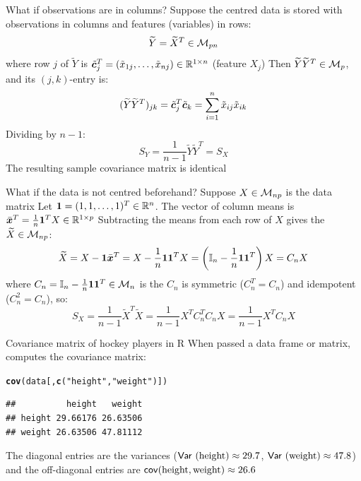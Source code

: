 \documentclass[aspectratio=169]{beamer}\usepackage[]{graphicx}\usepackage[]{xcolor}
\makeatletter
\newcommand{\hlsng}[1]{\textcolor[rgb]{0.192,0.494,0.8}{#1}}%
\newcommand{\hldef}[1]{\textcolor[rgb]{0.345,0.345,0.345}{#1}}%
\newcommand{\hlkwd}[1]{\textcolor[rgb]{0.737,0.353,0.396}{\textbf{#1}}}%
\newenvironment{kframe}{%
 \def\at@end@of@kframe{}%
 \ifinner\ifhmode%
  \def\at@end@of@kframe{\end{minipage}}%
  \begin{minipage}{\columnwidth}%
 \fi\fi%
 \def\FrameCommand##1{\hskip\@totalleftmargin \hskip-\fboxsep
 \colorbox{shadecolor}{##1}\hskip-\fboxsep
     \hskip-\linewidth \hskip-\@totalleftmargin \hskip\columnwidth}%
 \MakeFramed {\advance\hsize-\width
   \@totalleftmargin\z@ \linewidth\hsize
   \@setminipage}}%
 {\par\unskip\endMakeFramed%
 \at@end@of@kframe}
\newenvironment{knitrout}{}{} %
\makeatother
\begin{document}
\begin{frame}{What if observations are in columns?}
Suppose the centred data is stored with observations in columns and features (variables) in rows:
\[
\widetilde{Y} = \widetilde{X}^T \in \mathcal{M}_{pn}
\]
where row $j$ of $\widetilde{Y}$ is $\tilde{\bm{c}}_j^T = (\tilde{x}_{1j}, \ldots, \tilde{x}_{nj}) \in \mathbb{R}^{1\times n}$ (feature $X_j$)
\vfill
Then $\widetilde{Y}\widetilde{Y}^T \in \mathcal{M}_p$, and its $(j,k)$-entry is:
\[
(\widetilde{Y}\widetilde{Y}^T)_{jk} = \tilde{\bm{c}}_j^T\tilde{\bm{c}}_k = \sum_{i=1}^n \tilde{x}_{ij}\tilde{x}_{ik}
\]
\vfill
Dividing by $n-1$:
\[
S_Y = \frac{1}{n-1}\widetilde{Y}\widetilde{Y}^T = S_X
\]
\vfill
The resulting sample covariance matrix is identical
\end{frame}

\begin{frame}{What if the data is not centred beforehand?}
Suppose $X\in\mathcal{M}_{np}$ is the  data matrix
\vfill
Let $\mathbf{1} = (1, 1, \ldots, 1)^T \in \mathbb{R}^n$. The vector of column means is $\bar{\bm{x}}^T = \frac{1}{n}\mathbf{1}^T X \in \mathbb{R}^{1\times p}$
\vfill
Subtracting the means from each row of $X$ gives the  $\widetilde{X}\in\mathcal{M}_{np}$:
\[
\widetilde{X} = X - \mathbf{1}\bar{\bm{x}}^T = X - \frac{1}{n}\mathbf{1}\mathbf{1}^T X = \left(\mathbb{I}_n - \frac{1}{n}\mathbf{1}\mathbf{1}^T\right) X = C_n X
\]
where $C_n = \mathbb{I}_n - \frac{1}{n}\mathbf{1}\mathbf{1}^T\in\mathcal{M}_n$ is the 
\vfill
$C_n$ is symmetric ($C_n^T=C_n$) and idempotent ($C_n^2=C_n$), so:
\[
S_X = \frac{1}{n-1}\widetilde{X}^T\widetilde{X} = \frac{1}{n-1}X^T C_n^T C_n X = \frac{1}{n-1}X^T C_n X
\]
\end{frame}


\begin{frame}[fragile]{Covariance matrix of hockey players in R}
When passed a data frame or matrix,  computes the covariance matrix:
\vfill
\begin{knitrout}
\color{fgcolor}\begin{kframe}
\begin{alltt}
\hlkwd{cov}\hldef{(data[,} \hlkwd{c}\hldef{(}\hlsng{"height"}\hldef{,} \hlsng{"weight"}\hldef{)])}
\end{alltt}
\begin{verbatim}
##          height   weight
## height 29.66176 26.63506
## weight 26.63506 47.81112
\end{verbatim}
\end{kframe}
\end{knitrout}
\vfill
The diagonal entries are the variances ($\mathsf{Var}\ (\text{height})\approx 29.7$, $\mathsf{Var}\ (\text{weight})\approx 47.8$) and the off-diagonal entries are $\mathsf{cov}(\text{height}, \text{weight})\approx 26.6$
\end{frame}
\end{document}
